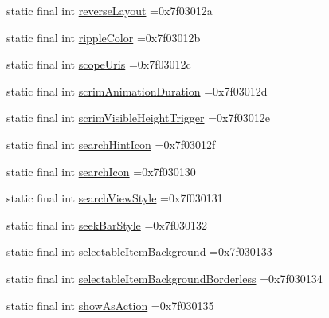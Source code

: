 \begin{DoxyCompactItemize}
\item 
static final int \mbox{\hyperlink{classbr_1_1unb_1_1cic_1_1mp_1_1marketmaster_1_1test_1_1R_1_1attr_ae33b2e842b00c21e6ca23fc760048691}{reverse\+Layout}} =0x7f03012a
\item 
static final int \mbox{\hyperlink{classbr_1_1unb_1_1cic_1_1mp_1_1marketmaster_1_1test_1_1R_1_1attr_ae8bc696de1dc4eb0944b60953f5896c1}{ripple\+Color}} =0x7f03012b
\item 
static final int \mbox{\hyperlink{classbr_1_1unb_1_1cic_1_1mp_1_1marketmaster_1_1test_1_1R_1_1attr_a614abcbb3da1be4a7c65f3ec51fb0e4a}{scope\+Uris}} =0x7f03012c
\item 
static final int \mbox{\hyperlink{classbr_1_1unb_1_1cic_1_1mp_1_1marketmaster_1_1test_1_1R_1_1attr_a0899b06ac78f5c18a754d1ad6ccaf33f}{scrim\+Animation\+Duration}} =0x7f03012d
\item 
static final int \mbox{\hyperlink{classbr_1_1unb_1_1cic_1_1mp_1_1marketmaster_1_1test_1_1R_1_1attr_a3a56e6a8219ed4c653ab75e320de2fc3}{scrim\+Visible\+Height\+Trigger}} =0x7f03012e
\item 
static final int \mbox{\hyperlink{classbr_1_1unb_1_1cic_1_1mp_1_1marketmaster_1_1test_1_1R_1_1attr_a8667e235c81ac0086fe99f03ebb36dfa}{search\+Hint\+Icon}} =0x7f03012f
\item 
static final int \mbox{\hyperlink{classbr_1_1unb_1_1cic_1_1mp_1_1marketmaster_1_1test_1_1R_1_1attr_a62ea0ddbf3ebeed62437c65d0cbb9555}{search\+Icon}} =0x7f030130
\item 
static final int \mbox{\hyperlink{classbr_1_1unb_1_1cic_1_1mp_1_1marketmaster_1_1test_1_1R_1_1attr_ac33de6b6a1f21faeeff9342777e0b012}{search\+View\+Style}} =0x7f030131
\item 
static final int \mbox{\hyperlink{classbr_1_1unb_1_1cic_1_1mp_1_1marketmaster_1_1test_1_1R_1_1attr_a4ecbeabcbe03e9a4970eeb7e086f11e5}{seek\+Bar\+Style}} =0x7f030132
\item 
static final int \mbox{\hyperlink{classbr_1_1unb_1_1cic_1_1mp_1_1marketmaster_1_1test_1_1R_1_1attr_ae4052012bc2b41ccaa257c2f69b045ca}{selectable\+Item\+Background}} =0x7f030133
\item 
static final int \mbox{\hyperlink{classbr_1_1unb_1_1cic_1_1mp_1_1marketmaster_1_1test_1_1R_1_1attr_ac7febadda3429710741025b125cc1fd3}{selectable\+Item\+Background\+Borderless}} =0x7f030134
\item 
static final int \mbox{\hyperlink{classbr_1_1unb_1_1cic_1_1mp_1_1marketmaster_1_1test_1_1R_1_1attr_a371fa452f3e4426522eaaa96bf773f9b}{show\+As\+Action}} =0x7f030135
\item 

\end{DoxyCompactItemize}
